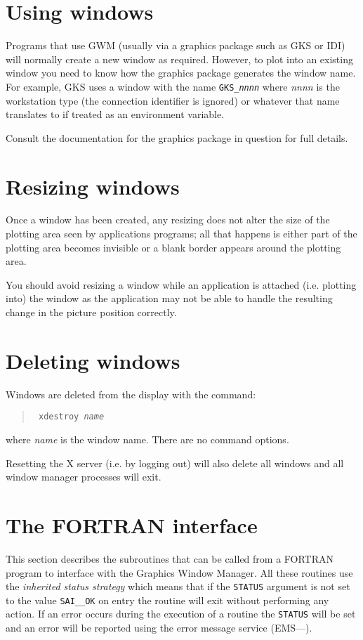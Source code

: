 \section{Using windows}

Programs that use GWM (usually via a graphics package such as GKS or IDI) will
normally create a new window as required. However, to plot into an existing
window you need to know how the graphics package generates the window name. For
example, GKS  uses a window with the name {\tt GKS\_{\em{nnnn}}} where {\em
nnnn} is the workstation type (the connection identifier is ignored) or
whatever that name translates to if treated as an environment variable.

Consult the documentation for the graphics package in question for full
details.

\section{Resizing windows}
Once a window has been created, any resizing does not alter the size of the
plotting area seen by applications programs; all that happens is either part of
the plotting area becomes invisible or a blank border appears around the
plotting area.

You should avoid resizing a window while an application is attached (i.e.
plotting into) the window as the application may not be able to handle the
resulting change in the picture position correctly.

\section{Deleting windows}
Windows are deleted from the display with the command:
\begin{quote}{\tt
xdestroy {\em name}}
\end{quote}
where {\em name} is the window name. There are no command options.

Resetting the X server (i.e. by logging out) will also delete all windows 
and all window manager processes will exit.

\section{The FORTRAN interface}

This section describes the subroutines that can be called from a FORTRAN
program to interface with the Graphics Window Manager. All these routines
use the {\em inherited status strategy} which means that if the {\tt STATUS}
argument is not set to the value {\tt SAI\_\_OK} on entry the routine will
exit without performing any action. If an error occurs during the execution
of a routine the {\tt STATUS} will be set and an error will be reported
using the error message service 
(EMS---).

